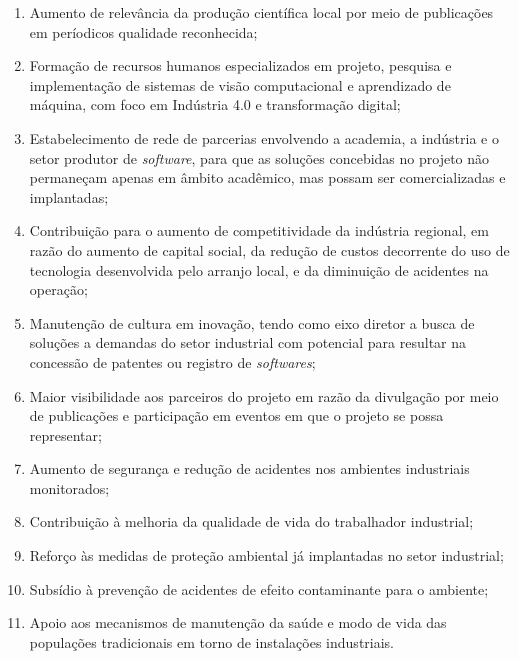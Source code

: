 \begin{enumerate}
    \item Aumento de relevância da produção científica local por meio de publicações em períodicos qualidade reconhecida;
    \item Formação de recursos humanos especializados em projeto, pesquisa e implementação de sistemas de visão computacional e aprendizado de máquina, com foco em Indústria 4.0 e transformação digital; 
    \item Estabelecimento de rede de parcerias envolvendo a academia, a indústria e o setor produtor de \emph{software}, para que as soluções concebidas no projeto não permaneçam apenas em âmbito acadêmico, mas possam ser comercializadas e implantadas; 
    \item Contribuição para o aumento de competitividade da indústria regional, em razão do aumento de capital social, da redução de custos decorrente do uso de tecnologia desenvolvida pelo arranjo local, e da diminuição de acidentes na operação;  
    \item Manutenção de cultura em inovação, tendo como eixo diretor a busca de soluções a demandas do setor industrial com potencial para resultar na concessão de patentes ou registro de \emph{softwares};
    \item Maior visibilidade aos parceiros do projeto em razão da divulgação por meio de publicações e participação em eventos em que o projeto se possa representar; 
    \item Aumento de segurança e redução de acidentes nos ambientes industriais monitorados;
    \item Contribuição à melhoria da qualidade de vida do trabalhador industrial;   
    \item Reforço às medidas de proteção ambiental já implantadas no setor industrial;
    \item Subsídio à prevenção de acidentes de efeito contaminante para o ambiente;
    \item Apoio aos mecanismos de manutenção da saúde e modo de vida das populações tradicionais em torno de instalações industriais.
\end{enumerate}
